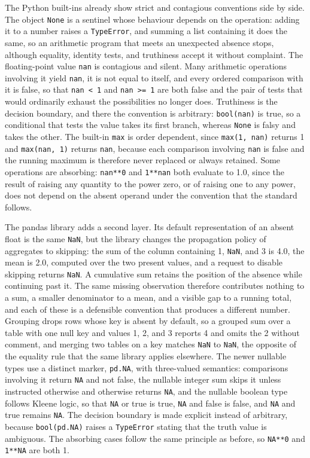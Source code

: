 \documentclass[11pt]{article}
\theoremstyle{remark}
\begin{document}
The Python built-ins already show strict and contagious conventions side by side. The object \verb|None| is a sentinel whose behaviour depends on the operation: adding it to a number raises a \verb|TypeError|, and summing a list containing it does the same, so an arithmetic program that meets an unexpected absence stops, although equality, identity tests, and truthiness accept it without complaint. The floating-point value \verb|nan| is contagious and silent. Many arithmetic operations involving it yield \verb|nan|, it is not equal to itself, and every ordered comparison with it is false, so that \verb|nan < 1| and \verb|nan >= 1| are both false and the pair of tests that would ordinarily exhaust the possibilities no longer does. Truthiness is the decision boundary, and there the convention is arbitrary: \verb|bool(nan)| is true, so a conditional that tests the value takes its first branch, whereas \verb|None| is falsy and takes the other. The built-in \verb|max| is order dependent, since \verb|max(1, nan)| returns 1 and \verb|max(nan, 1)| returns \verb|nan|, because each comparison involving \verb|nan| is false and the running maximum is therefore never replaced or always retained. Some operations are absorbing: \verb|nan**0| and \verb|1**nan| both evaluate to 1.0, since the result of raising any quantity to the power zero, or of raising one to any power, does not depend on the absent operand under the convention that the standard follows.

The pandas library adds a second layer. Its default representation of an absent float is the same \verb|NaN|, but the library changes the propagation policy of aggregates to skipping: the sum of the column containing 1, \verb|NaN|, and 3 is 4.0, the mean is 2.0, computed over the two present values, and a request to disable skipping returns \verb|NaN|. A cumulative sum retains the position of the absence while continuing past it. The same missing observation therefore contributes nothing to a sum, a smaller denominator to a mean, and a visible gap to a running total, and each of these is a defensible convention that produces a different number. Grouping drops rows whose key is absent by default, so a grouped sum over a table with one null key and values 1, 2, and 3 reports 4 and omits the 2 without comment, and merging two tables on a key matches \verb|NaN| to \verb|NaN|, the opposite of the equality rule that the same library applies elsewhere. The newer nullable types use a distinct marker, \verb|pd.NA|, with three-valued semantics: comparisons involving it return \verb|NA| and not false, the nullable integer sum skips it unless instructed otherwise and otherwise returns \verb|NA|, and the nullable boolean type follows Kleene logic, so that \verb|NA| or true is true, \verb|NA| and false is false, and \verb|NA| and true remains \verb|NA|. The decision boundary is made explicit instead of arbitrary, because \verb|bool(pd.NA)| raises a \verb|TypeError| stating that the truth value is ambiguous. The absorbing cases follow the same principle as before, so \verb|NA**0| and \verb|1**NA| are both 1.
\end{document}
